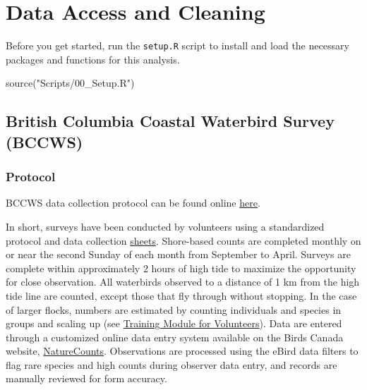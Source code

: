 \documentclass[
  letterpaper,
  DIV=11,
  numbers=noendperiod]{scrreprt}
\newenvironment{Shaded}{\begin{snugshade}}{\end{snugshade}}
\newcommand{\FunctionTok}[1]{\textcolor[rgb]{0.28,0.35,0.67}{#1}}
\newcommand{\NormalTok}[1]{\textcolor[rgb]{0.00,0.23,0.31}{#1}}
\newcommand{\StringTok}[1]{\textcolor[rgb]{0.13,0.47,0.30}{#1}}
\begin{document}

\chapter{Data Access and Cleaning}\label{data-access-and-cleaning}

Before you get started, run the \texttt{setup.R} script to install and
load the necessary packages and functions for this analysis.

\begin{Shaded}
\begin{Highlighting}[]
\FunctionTok{source}\NormalTok{(}\StringTok{"Scripts/00\_Setup.R"}\NormalTok{)}
\end{Highlighting}
\end{Shaded}

\section{British Columbia Coastal Waterbird Survey
(BCCWS)}\label{2.1Data}

\subsection{Protocol}\label{protocol}

BCCWS data collection protocol can be found online
\href{https://www.birdscanada.org/bird-science/british-columbia-coastal-waterbird-survey/bccws_resources}{here}.

In short, surveys have been conducted by volunteers using a standardized
protocol and data collection
\href{https://birdscanada.b-cdn.net/wp-content/uploads/2021/02/BCCWS_Datasheet.pdf}{sheets}.
Shore-based counts are completed monthly on or near the second Sunday of
each month from September to April. Surveys are complete within
approximately 2 hours of high tide to maximize the opportunity for close
observation. All waterbirds observed to a distance of 1 km from the high
tide line are counted, except those that fly through without stopping.
In the case of larger flocks, numbers are estimated by counting
individuals and species in groups and scaling up (see
\href{https://birdscanada.b-cdn.net/wp-content/uploads/2020/02/BCCWS-Training-Module.pdf}{Training
Module for Volunteers}). Data are entered through a customized online
data entry system available on the Birds Canada website,
\href{https://birdscanada.github.io/www.birdscanada.\%20org/birdmon/default/main.jsp}{NatureCounts}.
Observations are processed using the eBird data filters to flag rare
species and high counts during observer data entry, and records are
manually reviewed for form accuracy.
\end{document}
